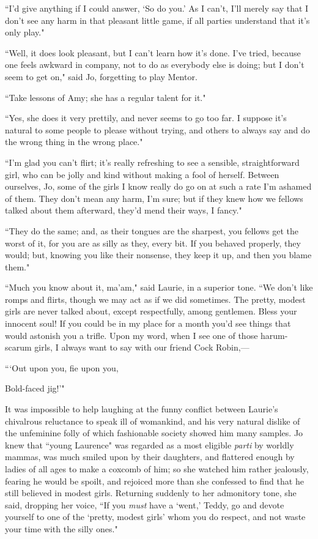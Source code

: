 ``I'd give anything if I could answer,
`So do you.' As I
can't, I'll merely say that I
don't see any harm in that pleasant little game, if all
parties understand that it's only play."

``Well, it does look pleasant, but I can't learn how
it's done. I've tried, because one feels
awkward in company, not to do as everybody else is doing; but I
don't seem to get on," said Jo, forgetting to play
Mentor.

``Take lessons of Amy; she has a regular talent for it."

``Yes, she does it very prettily, and never seems to go too far. I
suppose it's natural to some people to please without
trying, and others to always say and do the wrong thing in the wrong
place."

``I'm glad you can't flirt;
it's really refreshing to see a sensible,
straightforward girl, who can be jolly and kind without making a fool of
herself. Between ourselves, Jo, some of the girls I know really do go on
at such a rate I'm ashamed of them. They
don't mean any harm, I'm sure; but if
they knew how we fellows talked about them afterward,
they'd mend their ways, I fancy."

``They do the same; and, as their tongues are the sharpest, you fellows
get the worst of it, for you are as silly as they, every bit. If you
behaved properly, they would; but, knowing you like their nonsense, they
keep it up, and then you blame them."

``Much you know about it, ma'am," said Laurie, in a
superior tone. ``We don't like romps and flirts, though
we may act as if we did sometimes. The pretty, modest girls are never
talked about, except respectfully, among gentlemen. Bless your innocent
soul! If you could be in my place for a month you'd see
things that would astonish you a trifle. Upon my word, when I see one of
those harum-scarum girls, I always want to say with our friend Cock
Robin,---

```Out upon you, fie upon you,

Bold-faced jig!'"

It was impossible to help laughing at the funny conflict between
Laurie's chivalrous reluctance to speak ill of
womankind, and his very natural dislike of the unfeminine folly of which
fashionable society showed him many samples. Jo knew that ``young
Laurence" was regarded as a most eligible \emph{parti} by worldly
mammas, was much smiled upon by their daughters, and flattered enough by
ladies of all ages to make a coxcomb of him; so she watched him rather
jealously, fearing he would be spoilt, and rejoiced more than she
confessed to find that he still believed in modest girls. Returning
suddenly to her admonitory tone, she said, dropping her voice, ``If you
\emph{must} have a `went,' Teddy, go
and devote yourself to one of the `pretty, modest
girls' whom you do respect, and not waste your time
with the silly ones."

